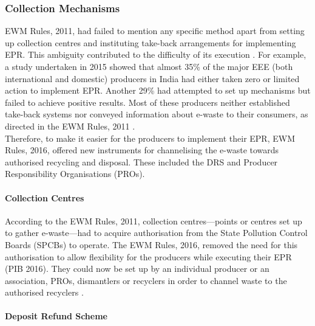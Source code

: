 \documentclass[a4paper, 12pt]{article}
\begin{document}
\subsubsection{Collection Mechanisms}
                    
                    EWM Rules, 2011, had failed to mention any specific method apart from setting up collection centres and instituting take-back arrangements for implementing EPR. This ambiguity contributed to the difficulty of its execution \parencite{pibreport}. For example, a study undertaken in 2015 showed that almost 35\% of the major EEE (both international and domestic) producers in India had either taken zero or limited action to implement EPR. Another 29\% had attempted to set up mechanisms but failed to achieve positive results. Most of these producers neither established take-back systems nor conveyed information about e-waste to their consumers, as directed in the EWM Rules, 2011 \parencite{toxicsreportb}. \\
                    
                    Therefore, to make it easier for the producers to implement their EPR, EWM Rules, 2016, offered new instruments for channelising the e-waste towards authorised recycling and disposal. These included the DRS and Producer Responsibility Organisations (PROs).
                    
\paragraph{Collection Centres} 
                    
                    According to the EWM Rules, 2011, collection centres—points or centres set up to gather e-waste—had to acquire authorisation from the State Pollution Control Boards (SPCBs) to operate. The EWM Rules, 2016, removed the need for this authorisation to allow flexibility for the producers while executing their EPR (PIB 2016). They could now be set up by an individual producer or an association, PROs, dismantlers or recyclers in order to channel waste to the authorised recyclers \parencite{pibreport}. 
                    
\paragraph{Deposit Refund Scheme}
                    
\end{document}

